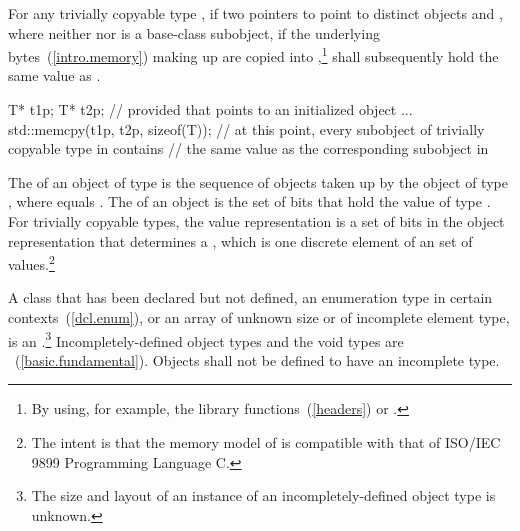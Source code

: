 \pnum
For any trivially copyable type , if two pointers to  point to
distinct  objects  and , where neither
 nor  is a base-class subobject, if the underlying
bytes~(\ref{intro.memory}) making up
 are copied into ,\footnote{By using, for example,
the library functions~(\ref{headers})  or .}
  shall subsequently hold the same value as
. \enterexample

\begin{codeblock}
T* t1p;
T* t2p;
    // provided that  points to an initialized object ...
std::memcpy(t1p, t2p, sizeof(T));
    // at this point, every subobject of trivially copyable type in  contains
    // the same value as the corresponding subobject in 
\end{codeblock}
\exitexample%

\pnum
The 
%
of an object of type  is the
sequence of    objects taken up
by the object of type , where  equals
. The
%
of an object is the set of bits that hold
the value of type . For trivially copyable types, the value representation is
a set of bits in the object representation that determines a
, which is one discrete element of an
 set of values.\footnote{The
intent is that the memory model of \Cpp is compatible
with that of ISO/IEC 9899 Programming Language C.}

\pnum
{}%
%
%
A class that has been declared but not defined, an enumeration type in certain
contexts~(\ref{dcl.enum}), or an array of unknown
size or of incomplete element type, is an .\footnote{The size and layout of an instance of an incompletely-defined
object type is unknown.}
Incompletely-defined object types and the void types are ~(\ref{basic.fundamental}). Objects shall not be defined to have an
incomplete type.


